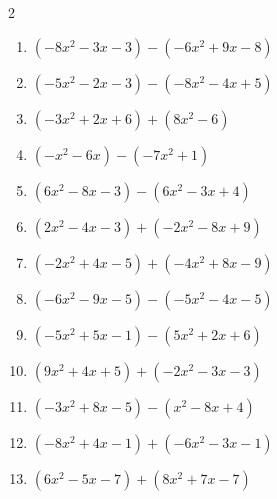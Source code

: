\begin{multicols}{2}
\begin{enumerate}

  \item $(-8x^{2}-3x-3)-(-6x^{2}+9x-8)$


  \item $(-5x^{2}-2x-3)-(-8x^{2}-4x+5)$


  \item $(-3x^{2}+2x+6)+(8x^{2}-6)$


  \item $(-x^{2}-6x)-(-7x^{2}+1)$


\columnbreak %

  \item $(6x^{2}-8x-3)-(6x^{2}-3x+4)$

        \phantom{$=-5x-7$}

  \item $(2x^{2}-4x-3)+(-2x^{2}-8x+9)$

        \phantom{$=-12x+6$}

  \item $(-2x^{2}+4x-5)+(-4x^{2}+8x-9)$


  \item $(-6x^{2}-9x-5)-(-5x^{2}-4x-5)$


  \item $(-5x^{2}+5x-1)-(5x^{2}+2x+6)$


  \item $(9x^{2}+4x+5)+(-2x^{2}-3x-3)$


  \item $(-3x^{2}+8x-5)-(x^{2}-8x+4)$


  \item $(-8x^{2}+4x-1)+(-6x^{2}-3x-1)$


  \item $(6x^{2}-5x-7)+(8x^{2}+7x-7)$



\end{enumerate}
\end{multicols}
